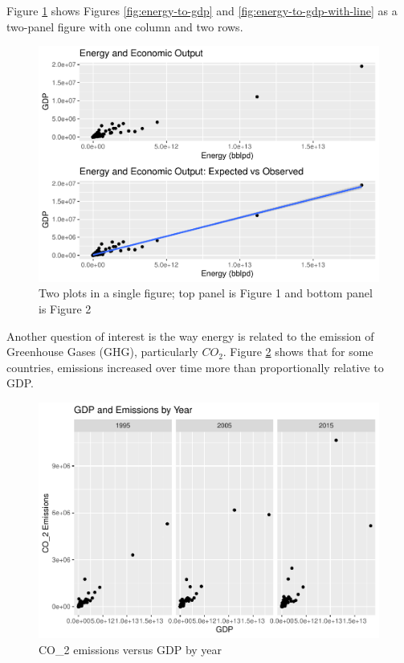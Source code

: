 \documentclass[]{elsarticle} %
\makeatletter
\def\maxwidth{\ifdim\Gin@nat@width>\linewidth\linewidth
\else\Gin@nat@width\fi}
\let\Oldincludegraphics\includegraphics
\renewcommand{\includegraphics}[1]{\Oldincludegraphics[width=\maxwidth]{#1}}
\makeatother
\begin{document}
Figure \ref{fig:top-bottom-panel-plot} shows Figures
\ref{fig:energy-to-gdp} and \ref{fig:energy-to-gdp-with-line} as a
two-panel figure with one column and two rows.

\begin{figure}
\centering
\includegraphics{Elsevier-Template_files/figure-latex/fig-top-bottom-panel-plot-1.pdf}
\caption{\label{fig:top-bottom-panel-plot} Two plots in a single figure;
top panel is Figure 1 and bottom panel is Figure 2}
\end{figure}

Another question of interest is the way energy is related to the
emission of Greenhouse Gases (GHG), particularly \(CO_2\). Figure
\ref{fig:gdp-emissions-by-year} shows that for some countries, emissions
increased over time more than proportionally relative to GDP.

\begin{figure}
\centering
\includegraphics{Elsevier-Template_files/figure-latex/fig-gdp-emissions-by-year-1.pdf}
\caption{\label{fig:gdp-emissions-by-year} CO\_2 emissions versus GDP by
year}
\end{figure}
\end{document}
